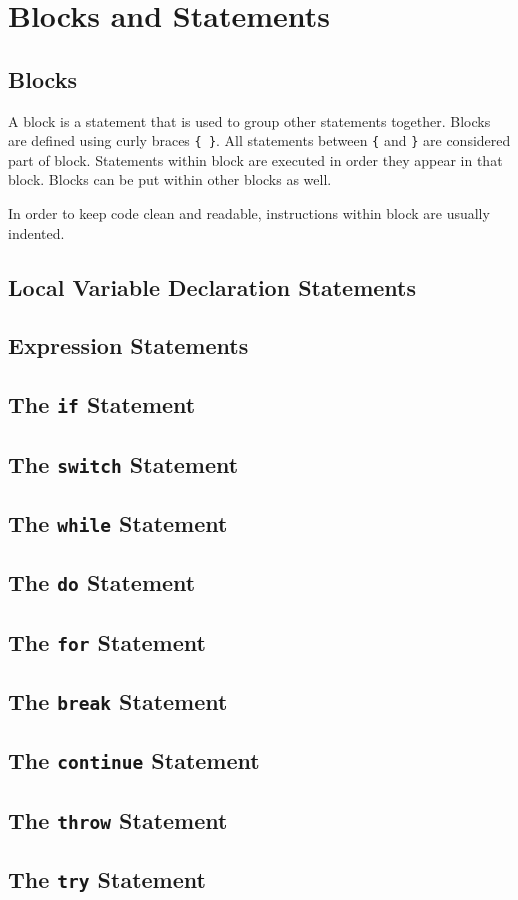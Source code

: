 
\chapter{Blocks and Statements}

\section{Blocks}
A block is a statement that is used to group other statements together. Blocks are defined using curly braces \texttt{\{ \}}. All statements between \texttt{\{} and \texttt{\}} are considered part of block. Statements within block are executed in order they appear in that block. Blocks can be put within other blocks as well.

In order to keep code clean and readable, instructions within block are usually indented.


\section{Local Variable Declaration Statements}
\section{Expression Statements}
\section{The \texttt{if} Statement}
\section{The \texttt{switch} Statement}
\section{The \texttt{while} Statement}
\section{The \texttt{do} Statement}
\section{The \texttt{for} Statement}
\section{The \texttt{break} Statement}
\section{The \texttt{continue} Statement}
\section{The \texttt{throw} Statement}
\section{The \texttt{try} Statement}
